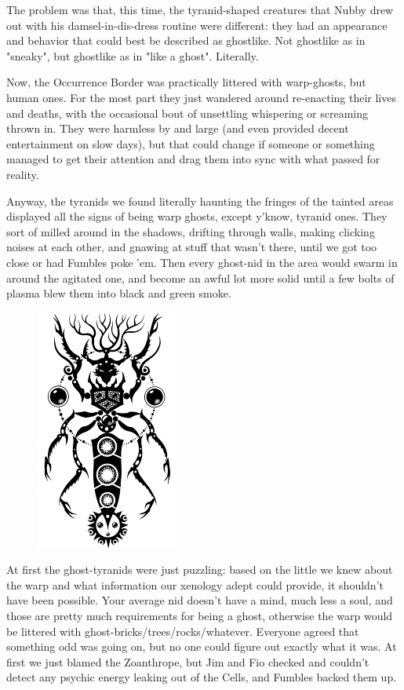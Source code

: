 The problem was that, this time, the tyranid-shaped creatures that Nubby drew out with his damsel-in-dis-dress routine were different: 
they had an appearance and behavior that could best be described as ghostlike. 
Not ghostlike as in "sneaky", but ghostlike as in "like a ghost". 
Literally. 


Now, the Occurrence Border was practically littered with warp-ghosts, but human ones. 
For the most part they just wandered around re-enacting their lives and deaths, with the occasional bout of unsettling whispering or screaming thrown in. 
They were harmless by and large (and even provided decent entertainment on slow days), but that could change if someone or something managed to get their attention and drag them into sync with what passed for reality. 


Anyway, the tyranids we found literally haunting the fringes of the tainted areas displayed all the signs of being warp ghosts, except y'know, tyranid ones. 
They sort of milled around in the shadows, drifting through walls, making clicking noises at each other, and gnawing at stuff that wasn't there, until we got too close or had Fumbles poke 'em. 
Then every ghost-nid in the area would swarm in around the agitated one, and become an awful lot more solid until a few bolts of plasma blew them into black and green smoke.

\begin{figure}
	\begin{center}
		\includegraphics[width=\figwidth]{pics/15/13.png}
	\end{center}
\end{figure}
At first the ghost-tyranids were just puzzling: 
based on the little we knew about the warp and what information our xenology adept could provide, it shouldn't have been possible. 
Your average nid doesn't have a mind, much less a soul, and those are pretty much requirements for being a ghost, otherwise the warp would be littered with ghost-bricks/trees/rocks/whatever. 
Everyone agreed that something odd was going on, but no one could figure out exactly what it was. 
At first we just blamed the Zoanthrope, but Jim and Fio checked and couldn't detect any psychic energy leaking out of the Cells, and Fumbles backed them up.

